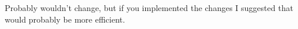 Probably wouldn't change, but if you implemented the changes I suggested that would probably be more efficient.
                                                                                                                                                                                                                                                                                                                                                                                                                                                                                                                                                                                                                                                                                                                                                                                                                                                                                                                                                                                                                                                                                                                                                                                                                                                                                                                                                                                                                                                                                                                                                                                                                                                                                                                                                                                                                                                                                                                                                                                                                                                                                                                                                                                                                                                                                                                                                                                                                                                                                                                                                                                                                                                                                                                                                                                                                                                                                                                                                                                                                                                                                                                                                                                                                                                                                                                                                        